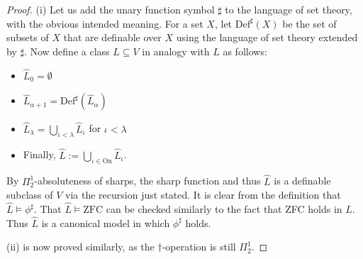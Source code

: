 \documentclass[10pt,a4paper]{amsart}
\begin{document}
\begin{proof}
(i) Let us add the unary function symbol $\sharp$ to the language of set theory, with the obvious intended meaning.
For a set $X$, let $\text{Def}^{\sharp}(X)$ be the set of
subsets of $X$ that are definable over $X$ using the language of set theory extended by $\sharp$. 
Now define a class $\hat{L}\subseteq V$ in analogy with $L$ as follows: 

\begin{itemize}
 \item $\hat{L}_{0}=\emptyset$
 \item $\hat{L}_{\alpha+1}=\text{Def}^{\sharp}(\hat{L}_{\alpha})$
 \item $\hat{L}_{\lambda}=\bigcup_{\iota<\lambda}\hat{L}_{\iota}$ for $\iota<\lambda$
 \item Finally, $\hat{L}:=\bigcup_{\iota\in\text{On}}\hat{L}_{\iota}$.
\end{itemize}

By $\Pi^{1}_{2}$-absoluteness of sharps, the sharp function and thus $\hat{L}$ is a definable subclass of $V$ via the recursion
just stated.
It is clear from the definition that $\hat{L}\models\phi^{\sharp}$. That $\hat{L}\models\text{ZFC}$ can be checked similarly
to the fact that ZFC holds in $L$. 
Thus $\hat{L}$ is a canonical model in which $\phi^{\sharp}$ holds.

(ii) is now proved similarly, as the $\dagger$-operation is still $\Pi^{1}_{2}$.
\end{proof}
\end{document}
